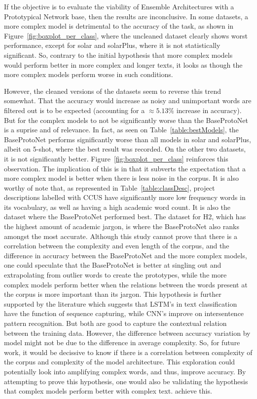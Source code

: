 \documentclass{article}
\begin{document}
If the objective is to evaluate
the viability of Ensemble Architectures with a Prototypical Network base, then the results are inconclusive. In some datasets, a more complex model is detrimental
to the accuracy of the task, as shown in Figure~\ref{fig:boxplot_per_class}, where the uncleaned dataset clearly shows worst performance, except for solar and solarPlus, where it is not statistically significant.
So, contrary to the initial hypothesis that more complex models would perform better in more complex and longer texts, it looks as though the more complex models perform worse in such conditions.

However, the cleaned versions of the datasets seem to reverse this trend somewhat. That the accuracy would increase as noisy and unimportant words are filtered out is to be expected (accounting for a $\approx 5.13\%$ increase in accuracy). 
But for the complex models to not be significantly worse than the BaseProtoNet is a suprise and of relevance.
In fact, as seen on Table~\ref{table:bestModels}, the BaseProtoNet performs significantly worse than all models in solar and solarPlus, albeit on 5-shot, where the best result was recorded. On the other two datasets, it is not significantly better. Figure~\ref{fig:boxplot_per_class} reinforces this observation.
The implication of this 
is in that it subverts the expectation that a more complex model is better when there is less noise in the corpus. It is also worthy of note that, as represented in Table~\ref{table:classDesc}, project descriptions labelled with CCUS
have significantly more low frequency words in its vocabulary, as well as having a high academic word count. It is also the dataset where the BaseProtoNet performed best. 
The dataset for H2, which has the highest amount of academic jargon, is where the BaseProtoNet also ranks amongst the most accurate. Although this study cannot prove that there is a correlation between the complexity and even length of the corpus, and the difference in accuracy between the BaseProtoNet and the more complex models, one could speculate that the BaseProtoNet is better at singling out and extrapolating from outlier words to create the prototypes, while the more complex models perform better when the relations between the words present at the corpus is more important than its jargon.
This hypothesis 
is further supported 
by the literature which suggests 
that LSTM's in text classification have the function of sequence capturing\cite{Xue2022-pw}, while CNN's improve on intersentence pattern recognition\cite{zhou2015clstmneuralnetworktext}. But both are good to capture the contextual relation between the training data\cite{KAUR2023108699}.
However, the difference between accuracy variation by model might not be due to the difference in average complexity. So, for future work, it would be decissive to know if there is a correlation between complexity of the corpus and complexity of the model architecture. This exploration could potentially look into amplifying complex words, and thus, improve accuracy. By attempting to prove this hypothesis, one would also be validating the hypothesis that complex models perform better with complex text.  
achieve this.
\end{document}
